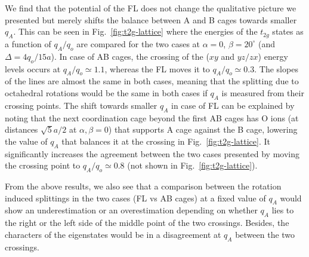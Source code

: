 \documentclass[a4paper,prb,twocolumn]{revtex4-1}  %
\newcommand{\com}[1]{}
\newcommand{\az}[1]{{\color{magenta}{#1}}} %
\begin{document}
\com{First,
FL does not preserve the cubic symmetry of the potential and the degeneracy of the t2g manifold 
is slightly lifted at zero rotations, i.e., for a cubic structure.
However, it is insignificant and we will not discuss it further.
What's more important is that the
potential of the full lattice does not change the qualitative picture we resented
but merely shifts the balance between A and B cages towards smaller $q_A$.
}

We find that the
potential of the FL does not change the qualitative picture we presented
but merely shifts the balance between A and B cages towards smaller $q_A$.
This can be seen in Fig.~\ref{fig:t2g-lattice}
where the energies of the $t_{2g}$ states as a function of $q_A/q_o$
are compared for the two cases
at $\alpha=0$, $\beta=20^\circ$ (and $\Delta=4q_o/15a$).
In case of AB cages, the crossing of the 
($xy$ and $yz/zx$)
energy levels occurs 
at $q_A/q_o\simeq1.1$,
whereas the FL moves it to $q_A/q_o\simeq0.3$.
The slopes of the lines are almost the same in both cases,
meaning that the splitting due to octahedral rotations 
would be the same in both cases if $q_A$ is measured 
from their crossing points.
The shift towards smaller $q_A$ in case of FL
can be explained by noting that
the next coordination cage beyond the first AB cages
has O ions
(at distances $\sqrt{5}a/2$ at $\alpha,\beta=0$) %
that supports A cage
against the B cage, lowering the value of $q_A$ that balances it
at the crossing in Fig.~\ref{fig:t2g-lattice}.
It significantly increases the agreement between the two cases presented
by moving the crossing point 
to $q_A/q_o\simeq0.8$ (not shown in Fig.~\ref{fig:t2g-lattice}).

From the above results, we also see that
a comparison between the rotation induced splittings
 in the two
cases (FL vs AB cages)
at a fixed value of $q_A$
would show an underestimation or an overestimation 
depending on whether $q_A$ lies to the right or the left side of the 
middle point of the two crossings.
Besides, the characters of the eigenstates
would be in a disagreement at $q_A$
between the two crossings.




\com{
Since the qualitative picture stays the same
in FL case,
we can 
think of the effect of the rest of the ions in the lattice
still in terms of the AB cages by renormalising $q_A$.
}
\end{document}

